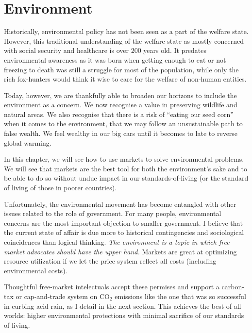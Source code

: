 \chapter{Environment}
\label{chpt:environment}

Historically, environmental policy has not been seen as a part of the welfare
state.  However, this traditional understanding of the welfare state as mostly
concerned with social security and healthcare is over 200 years old. It
predates environmental awareness as it was born when getting enough to eat or
not freezing to death was still a struggle for most of the population, while
only the rich fox-hunters would think it wise to care for the welfare of
non-human entities.

Today, however, we are thankfully able to broaden our horizons to include the
environment as a concern. We now recognise a value in preserving wildlife and
natural areas. We also recognise that there is a risk of ``eating our seed
corn'' when it comes to the environment, that we may follow an unsustainable
path to false wealth. We feel wealthy in our big cars until it becomes to late
to reverse global warming.

In this chapter, we will see how to use markets to solve environmental
problems. We will see that markets are the best tool for both the environment's
sake and to be able to do so without undue impact in our standards-of-living
(or the standard of living of those in poorer countries).

Unfortunately, the environmental movement has become entangled with other
issues related to the role of government. For many people, environmental
concerns are the most important objection to smaller government. I believe
that the current state of affair is due more to historical contingencies and
sociological coincidences than logical thinking. \emph{The environment is a
topic in which free market advocates should have the upper hand.} Markets are
great at optimizing resource utilization if we let the price system reflect all
costs (including environmental costs).

Thoughtful free-market intelectuals accept these permises and support a
carbon-tax or cap-and-trade system on CO$_2$ emissions like the one that was so
successful in curbing acid rain, as I detail in the next section. This achieves
the best of all worlds: higher environmental protections with minimal sacrifice
of our standards of living.

